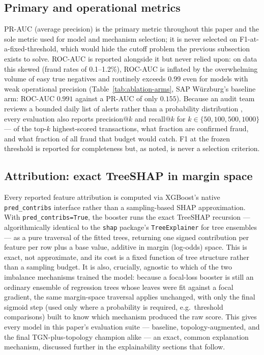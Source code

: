 \subsection{Primary and operational metrics}
PR-AUC (average precision) is the primary metric throughout this paper and the sole metric used for model and mechanism selection; it is never selected on F1-at-a-fixed-threshold, which would hide the cutoff problem the previous subsection exists to solve. ROC-AUC is reported alongside it but never relied upon: on data this skewed (fraud rates of 0.1--1.2\%), ROC-AUC is inflated by the overwhelming volume of easy true negatives and routinely exceeds 0.99 even for models with weak operational precision (Table~\ref{tab:ablation-arms}, SAP W\"urzburg's baseline arm: ROC-AUC $0.991$ against a PR-AUC of only $0.155$). Because an audit team reviews a bounded daily list of alerts rather than a probability distribution \cite{vasarhelyi2012acceptance}, every evaluation also reports precision@$k$ and recall@$k$ for $k \in \{50, 100, 500, 1000\}$ — of the top-$k$ highest-scored transactions, what fraction are confirmed fraud, and what fraction of all fraud that budget would catch. F1 at the frozen threshold is reported for completeness but, as noted, is never a selection criterion.

\subsection{Attribution: exact TreeSHAP in margin space}
Every reported feature attribution is computed via XGBoost's native \texttt{pred\_contribs} interface rather than a sampling-based SHAP approximation. With \texttt{pred\_contribs=True}, the booster runs the exact TreeSHAP recursion \cite{lundberg2017unified,lundberg2020local} — algorithmically identical to the \texttt{shap} package's \texttt{TreeExplainer} for tree ensembles — as a pure traversal of the fitted trees, returning one signed contribution per feature per row plus a base value, additive in margin (log-odds) space. This is exact, not approximate, and its cost is a fixed function of tree structure rather than a sampling budget. It is also, crucially, agnostic to which of the two imbalance mechanisms trained the model: because a focal-loss booster is still an ordinary ensemble of regression trees whose leaves were fit against a focal gradient, the same margin-space traversal applies unchanged, with only the final sigmoid step (used only where a probability is required, e.g.\ threshold comparisons) built to know which mechanism produced the raw score. This gives every model in this paper's evaluation suite — baseline, topology-augmented, and the final TGN-plus-topology champion alike — an exact, common explanation mechanism, discussed further in the explainability sections that follow.


